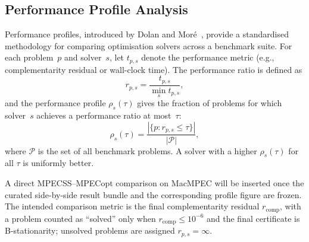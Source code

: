\subsection{Performance Profile Analysis}
\label{sec:perf_profile}

Performance profiles, introduced by Dolan and Mor\'{e}~\cite{DolanMore2002},
provide a standardised methodology for comparing optimisation solvers
across a benchmark suite.  For each problem~$p$ and solver~$s$, let
$t_{p,s}$ denote the performance metric (e.g., complementarity residual
or wall-clock time).  The performance ratio is defined as
\begin{equation*}
  r_{p,s} = \frac{t_{p,s}}{\min_s t_{p,s}},
\end{equation*}
and the performance profile $\rho_s(\tau)$ gives the fraction of
problems for which solver~$s$ achieves a performance ratio at most~$\tau$:
\begin{equation*}
  \rho_s(\tau) = \frac{|\{p : r_{p,s} \leq \tau\}|}{|\mathcal{P}|},
\end{equation*}
where $\mathcal{P}$ is the set of all benchmark problems.  A solver
with a higher $\rho_s(\tau)$ for all $\tau$ is uniformly better.

A direct MPECSS--MPECopt comparison on MacMPEC will be inserted once
the curated side-by-side result bundle and the corresponding profile
figure are frozen. The intended comparison metric is the final
complementarity residual $r_{\mathrm{comp}}$, with a problem counted as
``solved'' only when $r_{\mathrm{comp}} \leq 10^{-6}$ and the final
certificate is B-stationarity; unsolved problems are assigned
$r_{p,s} = \infty$.

\newcommand{\e}[1]{\times 10^{#1}}


